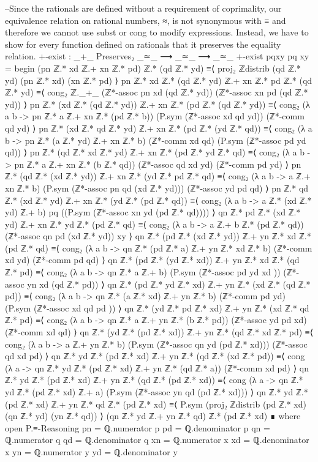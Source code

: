\documentclass[11pt,a4paper]{article}
\begin{document}
\begin{code}
--Since the rationals are defined without a requirement of coprimality, our equivalence relation on rational numbers, ≈, is not synonymous with ≡ and therefore we cannot use subst or cong to modify expressions. Instead, we have to show for every function defined on rationals that it preserves the equality relation.
+-exist :  _+_ Preserves₂ _≃_ ⟶ _≃_ ⟶ _≃_
+-exist {p}{q}{x}{y} pq xy =  begin 
        (pn ℤ.* xd ℤ.+ xn ℤ.* pd) ℤ.* (qd ℤ.* yd) ≡⟨ proj₂ ℤdistrib (qd ℤ.* yd) (pn ℤ.* xd) (xn ℤ.* pd)   ⟩
        pn ℤ.* xd ℤ.* (qd ℤ.* yd) ℤ.+ xn ℤ.* pd ℤ.* (qd ℤ.* yd) ≡⟨ cong₂ ℤ._+_ (ℤ*-assoc pn xd (qd ℤ.* yd)) (ℤ*-assoc xn pd (qd ℤ.* yd)) ⟩
        pn ℤ.* (xd ℤ.* (qd ℤ.* yd)) ℤ.+ xn ℤ.* (pd ℤ.* (qd ℤ.* yd)) ≡⟨ cong₂ (λ a b -> pn ℤ.* a ℤ.+ xn ℤ.* (pd ℤ.* b)) (P.sym (ℤ*-assoc xd qd yd)) (ℤ*-comm qd yd) ⟩
        pn ℤ.* (xd ℤ.* qd ℤ.* yd) ℤ.+ xn ℤ.* (pd ℤ.* (yd ℤ.* qd)) ≡⟨ cong₂ (λ a b -> pn ℤ.* (a ℤ.* yd) ℤ.+ xn ℤ.* b) (ℤ*-comm xd qd) (P.sym (ℤ*-assoc pd yd qd)) ⟩
        pn ℤ.* (qd ℤ.* xd ℤ.* yd) ℤ.+ xn ℤ.* (pd ℤ.* yd ℤ.* qd) ≡⟨ cong₂ (λ a b -> pn ℤ.* a ℤ.+ xn ℤ.* (b ℤ.* qd)) (ℤ*-assoc qd xd yd) (ℤ*-comm pd yd) ⟩
        pn ℤ.* (qd ℤ.* (xd ℤ.* yd)) ℤ.+ xn ℤ.* (yd ℤ.* pd ℤ.* qd) ≡⟨ cong₂ (λ a b -> a ℤ.+ xn ℤ.* b) (P.sym (ℤ*-assoc pn qd (xd ℤ.* yd))) (ℤ*-assoc yd pd qd) ⟩
        pn ℤ.* qd ℤ.* (xd ℤ.* yd) ℤ.+ xn ℤ.* (yd ℤ.* (pd ℤ.* qd)) ≡⟨ cong₂ (λ a b -> a ℤ.* (xd ℤ.* yd) ℤ.+ b) pq  ((P.sym (ℤ*-assoc xn yd (pd ℤ.* qd)))) ⟩
        qn ℤ.* pd ℤ.* (xd ℤ.* yd) ℤ.+ xn ℤ.* yd ℤ.* (pd ℤ.* qd) ≡⟨ cong₂ (λ a b -> a ℤ.+ b ℤ.* (pd ℤ.* qd)) (ℤ*-assoc qn pd (xd ℤ.* yd)) xy ⟩
        qn ℤ.* (pd ℤ.* (xd ℤ.* yd)) ℤ.+ yn ℤ.* xd ℤ.* (pd ℤ.* qd) ≡⟨ cong₂ (λ a b -> qn ℤ.* (pd ℤ.* a) ℤ.+ yn ℤ.* xd ℤ.* b) (ℤ*-comm xd yd) (ℤ*-comm pd qd) ⟩
        qn ℤ.* (pd ℤ.* (yd ℤ.* xd)) ℤ.+ yn ℤ.* xd ℤ.* (qd ℤ.* pd) ≡⟨ cong₂ (λ a b -> qn ℤ.* a ℤ.+ b) (P.sym (ℤ*-assoc pd yd xd )) (ℤ*-assoc yn xd (qd ℤ.* pd)) ⟩
        qn ℤ.* (pd ℤ.* yd ℤ.* xd) ℤ.+ yn ℤ.* (xd ℤ.* (qd ℤ.* pd)) ≡⟨ cong₂ (λ a b -> qn ℤ.* (a ℤ.* xd) ℤ.+ yn ℤ.* b) (ℤ*-comm pd yd) (P.sym (ℤ*-assoc xd qd pd )) ⟩
        qn ℤ.* (yd ℤ.* pd ℤ.* xd) ℤ.+ yn ℤ.* (xd ℤ.* qd ℤ.* pd) ≡⟨ cong₂ (λ a b -> qn ℤ.* a ℤ.+ yn ℤ.* (b ℤ.* pd)) (ℤ*-assoc yd pd xd) (ℤ*-comm xd qd) ⟩
        qn ℤ.* (yd ℤ.* (pd ℤ.* xd)) ℤ.+ yn ℤ.* (qd ℤ.* xd ℤ.* pd) ≡⟨ cong₂ (λ a b -> a ℤ.+ yn ℤ.* b) (P.sym (ℤ*-assoc qn yd (pd ℤ.* xd))) (ℤ*-assoc qd xd pd) ⟩
        qn ℤ.* yd ℤ.* (pd ℤ.* xd) ℤ.+ yn ℤ.* (qd ℤ.* (xd ℤ.* pd)) ≡⟨ cong (λ a -> qn ℤ.* yd ℤ.* (pd ℤ.* xd) ℤ.+ yn ℤ.* (qd ℤ.* a)) (ℤ*-comm xd pd) ⟩
        qn ℤ.* yd ℤ.* (pd ℤ.* xd) ℤ.+ yn ℤ.* (qd ℤ.* (pd ℤ.* xd)) ≡⟨ cong (λ a -> qn ℤ.* yd ℤ.* (pd ℤ.* xd) ℤ.+ a) (P.sym (ℤ*-assoc yn qd (pd ℤ.* xd))) ⟩
        qn ℤ.* yd ℤ.* (pd ℤ.* xd) ℤ.+ yn ℤ.* qd ℤ.* (pd ℤ.* xd) ≡⟨ P.sym (proj₂ ℤdistrib (pd ℤ.* xd) (qn ℤ.* yd) (yn ℤ.* qd)) ⟩
        (qn ℤ.* yd ℤ.+ yn ℤ.* qd) ℤ.* (pd ℤ.* xd)
        ∎
         where
           open P.≡-Reasoning
           pn = ℚ.numerator p
           pd = ℚ.denominator p
           qn = ℚ.numerator q
           qd = ℚ.denominator q
           xn = ℚ.numerator x
           xd = ℚ.denominator x
           yn = ℚ.numerator y
           yd = ℚ.denominator y
\end{code}
\end{document}
